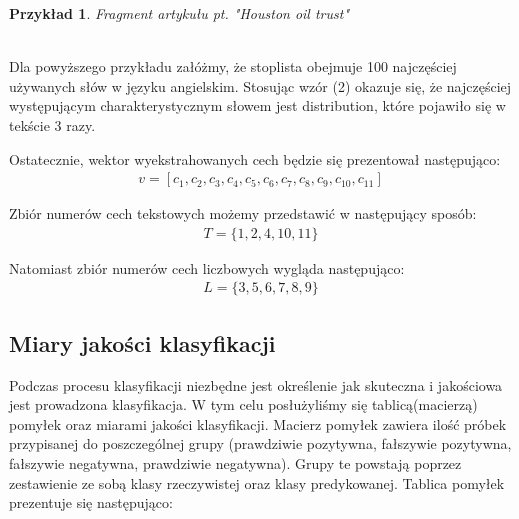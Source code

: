 \documentclass{classrep}
\newtheorem{exmp}{Przykład}[section]
\begin{document}
\begin{enumerate}
	\begin{exmp}
    Fragment artykułu pt. "Houston oil trust"  \cite{reuters} \\
     \\
    \end{exmp} 
    Dla powyższego przykładu załóżmy, że stoplista obejmuje 100 najczęściej używanych słów w języku angielskim. Stosując wzór (2) okazuje się, że najczęściej występującym charakterystycznym słowem jest distribution, które pojawiło się w tekście 3 razy. \\
\end{enumerate}
Ostatecznie, wektor wyekstrahowanych cech będzie się prezentował następująco: 
\begin{gather}
v = [c_{1}, c_{2}, c_{3}, c_{4}, c_{5}, c_{6}, c_{7}, c_{8}, c_{9}, c_{10}, c_{11}] 
\end{gather}

Zbiór numerów cech tekstowych możemy przedstawić w następujący sposób:
\begin{gather}
\label{tekstowe}
    T = \{1, 2, 4, 10, 11\}
\end{gather}

Natomiast zbiór numerów cech liczbowych wygląda następująco:
\begin{gather}
\label{liczbowe}
    L = \{3, 5, 6, 7, 8, 9\}
\end{gather}

\subsection{Miary jakości klasyfikacji} 
Podczas procesu klasyfikacji niezbędne jest określenie jak skuteczna i jakościowa jest prowadzona klasyfikacja. W tym celu posłużyliśmy się tablicą(macierzą) pomyłek oraz miarami jakości klasyfikacji.\cite{tablica_pomylek} Macierz pomyłek zawiera ilość próbek przypisanej do poszczególnej grupy (prawdziwie pozytywna, fałszywie pozytywna, fałszywie negatywna, prawdziwie negatywna). Grupy te powstają poprzez zestawienie ze sobą klasy rzeczywistej oraz klasy predykowanej. Tablica pomyłek prezentuje się następująco: \\
\end{document}
